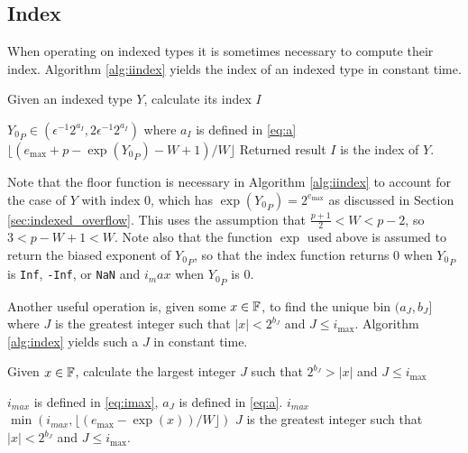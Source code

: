   \subsection{Index}
    \label{sec:primitiveops_index}
    When operating on indexed types it is sometimes necessary to compute their
    index. Algorithm \ref{alg:iindex} yields the index of an indexed type in
    constant time.

    \begin{samepage}
    \begin{alg}
      Given an indexed type $Y$, calculate its index $I$
      \begin{algorithmic}[1]
        \Require
          \Statex ${Y_0}_P \in (\epsilon^{-1}  2^{a_{I}}, 2  \epsilon^{-1}  2^{a_I})$
          where $a_I$ is defined in \eqref{eq:a}
          \State \Return $\lfloor(e_{\max} + p - \exp({Y_0}_P) - W + 1)/W\rfloor$
        \EndFunction
        \Ensure
          \Statex Returned result $I$ is the index of $Y$.
      \end{algorithmic}
      \label{alg:iindex}
    \end{alg}
    \end{samepage}

    Note that the floor function is necessary in Algorithm \ref{alg:iindex} to
    account for the case of $Y$ with index $0$, which has $\exp({Y_0}_P) =
    2^{e_{\max}}$ as discussed in Section \ref{sec:indexed_overflow}.  This
    uses the assumption that $\frac{p+1}{2} < W < p-2$, so $3 < p - W + 1 < W.$ 
    Note also that the function $\exp$ used above is assumed to return the biased exponent of ${Y_0}_P$, so that the index function returns 0 when ${Y_0}_P$ is \texttt{Inf}, \texttt{-Inf}, or \texttt{NaN} and $i_max$ when ${Y_0}_P$ is 0.

    Another useful operation is, given some $x \in \mathbb{F}$, to find the unique bin
    $(a_J, b_J]$ where $J$ is the greatest integer such that $|x| < 2^{b_J}$ and $J \leq i_{\max}$.
    Algorithm \ref{alg:index} yields such a $J$ in constant time.

    \begin{samepage}
    \begin{alg}
      Given $x \in \mathbb{F}$, calculate the largest integer $J$ such that $2^{b_J} > |x|$ and $J \leq i_{\max}$
      \begin{algorithmic}[1]
        \Require $i_{max}$ is defined in \eqref{eq:imax},
          $a_J$ is defined in \eqref{eq:a}.
           \State \Return $i_{max}$ \EndIf
          \State \Return $\min(i_{max}, \lfloor(e_{\max} - \exp(x))/W\rfloor)$
        \EndFunction
        \Ensure
          \Statex $J$ is the greatest integer such that $|x| < 2^{b_J}$ and $J \leq i_{\max}$.
      \end{algorithmic}
      \label{alg:index}
    \end{alg}
     \end{samepage}

